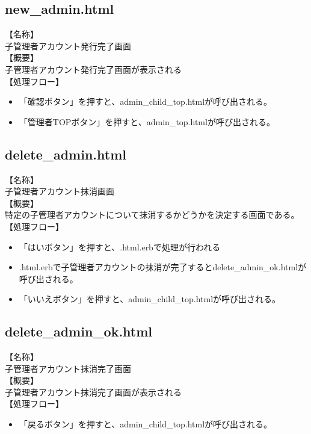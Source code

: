 \documentclass[a4j]{jarticle}
\begin{document}
\subsection{new\_admin.html}
\noindent
【名称】\\
子管理者アカウント発行完了画面\\
【概要】\\
子管理者アカウント発行完了画面が表示される\\
【処理フロー】
\begin{itemize}
\item 「確認ボタン」を押すと、admin\_child\_top.htmlが呼び出される。
\item 「管理者TOPボタン」を押すと、admin\_top.htmlが呼び出される。
\end{itemize}

\subsection{delete\_admin.html}
\noindent
【名称】\\
子管理者アカウント抹消画面\\
【概要】\\
特定の子管理者アカウントについて抹消するかどうかを決定する画面である。\\
【処理フロー】
\begin{itemize}
\item 「はいボタン」を押すと、.html.erbで処理が行われる
\item .html.erbで子管理者アカウントの抹消が完了するとdelete\_admin\_ok.htmlが呼び出される。
\item 「いいえボタン」を押すと、admin\_child\_top.htmlが呼び出される。
\end{itemize}

\subsection{delete\_admin\_ok.html}
\noindent
【名称】\\
子管理者アカウント抹消完了画面\\
【概要】\\
子管理者アカウント抹消完了画面が表示される\\
【処理フロー】
\begin{itemize}
\item 「戻るボタン」を押すと、admin\_child\_top.htmlが呼び出される。
\end{itemize}
\end{document}
